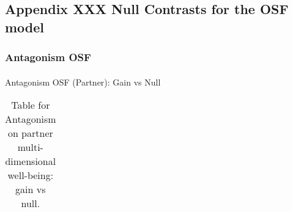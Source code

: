 \documentclass[
  singlecolumn]{article}
\makeatletter
\let\oldparagraph\paragraph
\renewcommand{\paragraph}{
    \@ifstar
      \xxxParagraphStar
      \xxxParagraphNoStar
  }
\newcommand{\xxxParagraphStar}[1]{\oldparagraph*{#1}\mbox{}}
\newcommand{\xxxParagraphNoStar}[1]{\oldparagraph{#1}\mbox{}}
\makeatother
\begin{document}
\subsection{Appendix XXX Null Contrasts for the OSF
model}\label{appendix-xxx-null-contrasts-for-the-osf-model}

\subsubsection{Antagonism OSF}\label{antagonism-osf}

\paragraph{Antagonism OSF (Partner): Gain vs
Null}\label{antagonism-osf-partner-gain-vs-null}

\begin{longtable}[]{@{}
  >{\raggedright\arraybackslash}p{}
  >{\raggedleft\arraybackslash}p{}
  >{\raggedleft\arraybackslash}p{}
  >{\raggedleft\arraybackslash}p{}
  >{\raggedleft\arraybackslash}p{}
  >{\raggedleft\arraybackslash}p{}@{}}

\caption{\label{tbl-results-antagonism-partner-null-gain-osf}Table for
Antagonism on partner multi-dimensional well-being: gain vs null.}

\tabularnewline


\end{longtable}
\end{document}

